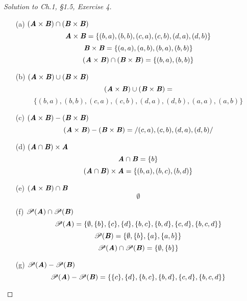 \documentclass[12pt]{amsart}
\numberwithin{equation}{section}
\theoremstyle{definition}
\theoremstyle{remark}
\begin{document}
\begin{proof}[Solution to Ch.1, \S 1.5,  Exercise 4] \ \\

\begin{enumerate}

\item[(a)]
$ ( \textbf{\textit{A}} \times \textbf{\textit{B}} ) \cap ( \textbf{\textit{B}} \times \textbf{\textit{B}} ) $
$$
\textbf{\textit{A}} \times \textbf{\textit{B}} = \{ (b, a), (b, b), (c, a), (c, b), (d, a), (d, b) \}
$$
$$
\textbf{\textit{B}} \times \textbf{\textit{B}} = \{ (a, a), (a, b), (b, a), (b, b) \}
$$
$$
( \textbf{\textit{A}} \times \textbf{\textit{B}} ) \cap ( \textbf{\textit{B}} \times \textbf{\textit{B}} ) = \{ (b, a), (b, b) \}
$$

\item[(b)]
$ ( \textbf{\textit{A}} \times \textbf{\textit{B}} ) \cup ( \textbf{\textit{B}} \times \textbf{\textit{B}} ) $
$$
( \textbf{\textit{A}} \times \textbf{\textit{B}} ) \cup ( \textbf{\textit{B}} \times \textbf{\textit{B}} ) = 
$$
$$
\{ (b, a), (b, b), (c, a), (c, b), (d, a), (d, b), (a, a), (a, b) \}
$$

\item[(c)]
$ ( \textbf{\textit{A}} \times \textbf{\textit{B}} ) - ( \textbf{\textit{B}} \times \textbf{\textit{B}} ) $
$$
( \textbf{\textit{A}} \times \textbf{\textit{B}} ) - ( \textbf{\textit{B}} \times \textbf{\textit{B}} ) = /{ (c, a), (c, b), (d, a), (d, b) /}
$$

\item[(d)]
$ ( \textbf{\textit{A}} \cap \textbf{\textit{B}} ) \times \textbf{\textit{A}} $
$$
\textbf{\textit{A}} \cap \textbf{\textit{B}} = \{ b \}
$$
$$
( \textbf{\textit{A}} \cap \textbf{\textit{B}} ) \times \textbf{\textit{A}} = \{ (b, a), (b, c), (b, d) \}
$$

\item[(e)]
$ ( \textbf{\textit{A}} \times \textbf{\textit{B}} ) \cap \textbf{\textit{B}} $
$$
\emptyset
$$

\item[(f)]
$ \mathscr{P}( \textbf{\textit{A}} ) \cap \mathscr{P}( \textbf{\textit{B}} ) $
$$
\mathscr{P}( \textbf{\textit{A}} ) = \{ \emptyset, \{ b \}, \{ c \}, \{ d \}, \{ b, c \}, \{ b, d \}, \{ c, d \}, \{ b, c, d \} \}
$$
$$
\mathscr{P}( \textbf{\textit{B}} ) = \{ \emptyset, \{ b \}, \{ a \}, \{ a, b \} \}
$$
$$
\mathscr{P}( \textbf{\textit{A}} ) \cap \mathscr{P}( \textbf{\textit{B}} ) = \{ \emptyset, \{ b \} \}
$$

\item[(g)]
$ \mathscr{P}( \textbf{\textit{A}} ) - \mathscr{P}( \textbf{\textit{B}} ) $
$$
 \mathscr{P}( \textbf{\textit{A}} ) - \mathscr{P}( \textbf{\textit{B}} ) = \{ \{ c \}, \{ d \}, \{ b, c \}, \{ b, d \}, \{ c, d \}, \{ b, c, d \} \}
$$


\end{enumerate}
\end{proof}
\end{document}
